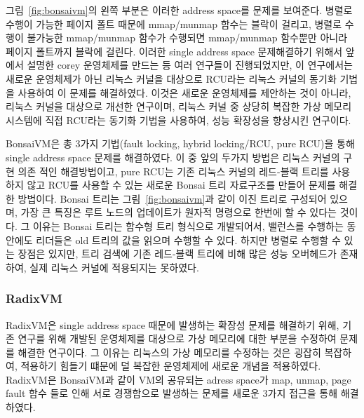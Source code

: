 그림~\ref{fig:bonsaivm}의 왼쪽 부분은 이러한 address space를 문제를 보여준다. 
병렬로 수행이 가능한 페이지 폴트 때문에 mmap/munmap 함수는 블락이 걸리고, 병렬로 
수행이 불가능한 mmap/munmap 함수가 수행되면 mmap/munmap 함수뿐만 아니라 페이지 폴트까지 블락에 걸린다.
이러한 single address space 문제해결하기 위해서 앞에서 설명한 corey 운영체제를 만드는 등 여러 연구들이 
진행되었지만, 이 연구에서는 새로운 운영체제가 아닌 리눅스 커널을 대상으로 RCU라는 리눅스 커널의 동기화
기법을 사용하여 이 문제를 해결하였다. 
이것은 새로운 운영체제를 제안하는 것이 아니라, 리눅스 커널을 대상으로 개선한 연구이며, 리눅스 커널 중 상당히 
복잡한 가상 메모리 시스템에 직접 RCU라는 동기화 기법을 사용하여, 성능 확장성을 향상시킨 연구이다.
 
BonsaiVM은 총 3가지 기법(fault locking, hybrid locking/RCU, pure RCU)을 통해 single
address space 문제를 해결하였다.
이 중 앞의 두가지 방법은 리눅스 커널의 구현 의존 적인 해결방법이고, pure RCU는 
기존 리눅스 커널의 레드-블랙 트리를 사용하지 않고 RCU를 사용할 수 있는 
새로운 Bonsai 트리 자료구조를 만들어 문제를 해결한 방법이다. 
Bonsai 트리는 그림~\ref{fig:bonsaivm}과 같이 이진 트리로 구성되어 있으며, 
가장 큰 특징은 루트 노드의 업데이트가 원자적 명령으로 한번에 할 수 있다는 것이다. 
그 이유는 Bonsai 트리는 함수형 트리 형식으로 개발되어서, 밸런스를 수행하는 동안에도 리더들은 
old 트리의 값을 읽으며 수행할 수 있다. 
하지만 병렬로 수행할 수 있는 장점은 있지만, 트리 검색에 기존 레드-블랙 트리에 비해 많은 성능 
오버헤드가 존재하여, 실제 리눅스 커널에 적용되지는 못하였다. 
 

\subsubsection{RadixVM}

RadixVM은 single address space 때문에 발생하는 확장성 문제를 해결하기 위해, 
기존 연구를 위해 개발된 운영체제를 대상으로 가상 메모리에 대한 부분을 수정하여 문제를 해결한 연구이다.
그 이유는 리눅스의 가상 메모리를 수정하는 것은 굉잡히 복잡하여, 적용하기 힘들기 떄문에 
덜 복잡한 운영체제에 새로운 개념을 적용하였다. 
RadixVM은 BonsaiVM과 같이 VM의 공유되는 adress space가 map, unmap, page fault 함수 들로 인해 
서로 경쟁함으로 발생하는 문제를 새로운 3가지 접근을 통해 해결하였다. 


